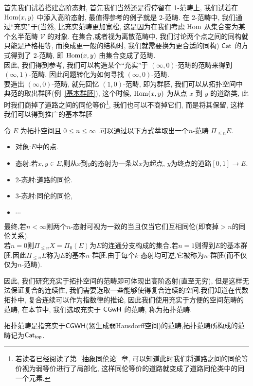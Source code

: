 首先我们试着搭建高阶态射, 首先我们当然还是得停留在 1-范畴上, 我们试着在 $\operatorname{Hom}(x,y)$ 中添入高阶态射, 最值得参考的例子就是 2-范畴. 在 2-范畴中, 我们通过``充实''于(当然, 比充实范畴更加宽松, 这是因为在我们考虑 $\operatorname{Hom}$ 从集合变为某个幺半范畴 $\mathcal{V}$ 的对象. 在集合,或者视为离散范畴中, 我们讨论两个点之间的同构就只能是严格相等, 而换成更一般的结构时, 我们就需要换为更合适的同构) $\mathsf{Cat}$ 的方式得到了 $2$-范畴, 即 $\operatorname{Hom}(x,y)$ 由集合变成了范畴.\\
 因此, 我们得到参考, 我们可以构造某个``充实''于 $(\infty,0)$-范畴的范畴来得到 $(\infty,1)$-范畴, 因此问题转化为如何寻找 $(\infty,0)$-范畴.\\
要造出 $(\infty,0)$-范畴, 就先回忆 $(1,0)$-范畴, 即为群胚, 我们可以从拓扑空间中典范的取出群胚(例~\ref{基本群胚}), 这个时候, $\operatorname{Hom}(x,y)$ 为从点 $x$ 到 $y$ 的道路类, 此时我们商掉了道路之间的同伦等价\footnote{若读者已经阅读了第~\ref{抽象同伦论}~章, 可以知道此时我们将道路之间的同伦等价视为弱等价进行了局部化, 这样同伦等价的道路就变成了道路同伦类中的同一个元素.}, 我们也可以不商掉它们, 而是将其保留, 这样我们可以得到推广的基本群胚
 \begin{example}[基本群胚]\label{Exp:群胚}
    令 $E$ 为拓扑空间且 $0 \leq n \leq \infty$ .可以通过以下方式萃取出一个$n$-范畴 $\Pi_{\leq n} E$. 
    \begin{itemize}
        \item 对象:$E$中的点.
        \item 态射:若$x,y\in E$,则从$x$到$y$的态射为一条以$x$为起点, $y$为终点的道路$[0,1]\to E$.
        \item 2-态射:道路的同伦.
        \item 3-态射:同伦的同伦,
        \item $\cdots$
    \end{itemize}
    最终,若$n < \infty$则两个$n$-态射可视为一致的当且仅当它们互相同伦(即商掉$>n$的同伦关系).\\
    若$n = 0$则$\Pi_{\leq n}X = \Pi_0(E)$为$E$的连通分支构成的集合.若$n = 1$则得到$E$的基本群胚.因此$\Pi_{\leq n}E$称为$E$的基本$n$-群胚.由于每个$k$-态射均可逆,它被称为$n$-群胚(而不仅仅为$n$-范畴).
\end{example}
因此, 我们研究充实于拓扑空间的范畴即可体现出高阶态射(直至无穷), 但是这样无法保证复合的连续性, 我们需要选取一些能够使得复合连续的空间.我们知道在代数拓扑中, 复合连续可以作为指数律的推论, 因此我们使用充实于方便的空间范畴的范畴, 在本节中, 我们选取充实于 $\mathsf{CGwH}$ 的范畴, 称为拓扑范畴.
\begin{definition}[拓扑范畴]
    拓扑范畴是指充实于$\mathsf{CGWH}$(紧生成弱Hausdorff空间)的范畴,拓扑范畴所构成的范畴记为$\mathsf{Cat}_{\mathsf{top}}$.
\end{definition}
